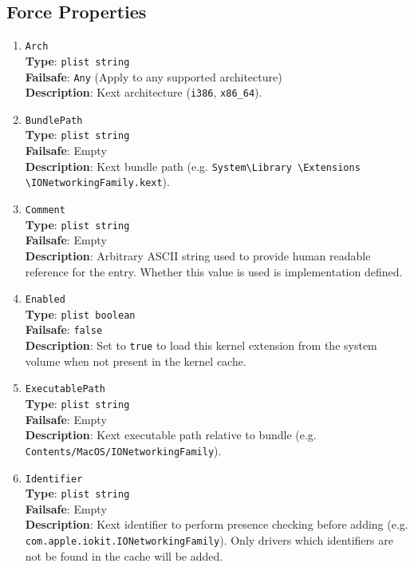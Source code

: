 \documentclass[]{article}
\begin{document}
\subsection{Force Properties}\label{kernelpropsforce}

\begin{enumerate}

\item
  \texttt{Arch}\\
  \textbf{Type}: \texttt{plist\ string}\\
  \textbf{Failsafe}: \texttt{Any} (Apply to any supported architecture)\\
  \textbf{Description}: Kext architecture (\texttt{i386}, \texttt{x86\_64}).

\item
  \texttt{BundlePath}\\
  \textbf{Type}: \texttt{plist\ string}\\
  \textbf{Failsafe}: Empty\\
  \textbf{Description}: Kext bundle path (e.g.
  \texttt{System\textbackslash Library \textbackslash Extensions \textbackslash IONetworkingFamily.kext}).

\item
  \texttt{Comment}\\
  \textbf{Type}: \texttt{plist\ string}\\
  \textbf{Failsafe}: Empty\\
  \textbf{Description}: Arbitrary ASCII string used to provide human readable
  reference for the entry. Whether this value is used is implementation defined.

\item
  \texttt{Enabled}\\
  \textbf{Type}: \texttt{plist\ boolean}\\
  \textbf{Failsafe}: \texttt{false}\\
  \textbf{Description}: Set to \texttt{true} to load this kernel extension from the
  system volume when not present in the kernel cache.

\item
  \texttt{ExecutablePath}\\
  \textbf{Type}: \texttt{plist\ string}\\
  \textbf{Failsafe}: Empty\\
  \textbf{Description}: Kext executable path relative to bundle
  (e.g. \texttt{Contents/MacOS/IONetworkingFamily}).

\item
  \texttt{Identifier}\\
  \textbf{Type}: \texttt{plist\ string}\\
  \textbf{Failsafe}: Empty\\
  \textbf{Description}: Kext identifier to perform presence checking
  before adding (e.g. \texttt{com.apple.iokit.IONetworkingFamily}).
  Only drivers which identifiers are not be found in the cache will be added.


\end{enumerate}
\end{document}
